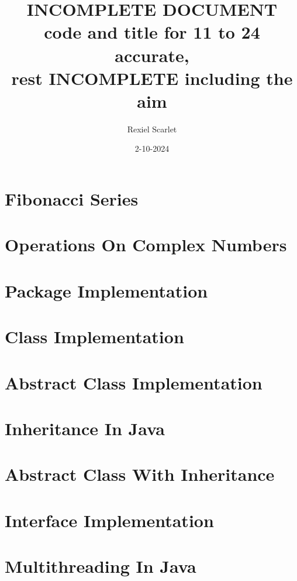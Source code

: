\documentclass{article}
\title{%
  INCOMPLETE DOCUMENT \\
  \large code and title for 11 to 24 accurate, \\
  rest INCOMPLETE including the aim \\
}
\author{Rexiel Scarlet}
\date{2-10-2024}
\begin{document}
\maketitle
\newpage

\tableofcontents
\newpage

\section{Fibonacci Series}

\newpage

\section{Operations On Complex Numbers}

\newpage

\section{Package Implementation}
\newpage

\section{Class Implementation}

\newpage

\section{Abstract Class Implementation}

\newpage

\section{Inheritance In Java}

\newpage

\section{Abstract Class With Inheritance}

\newpage

\section{Interface Implementation}

\newpage

\section{Multithreading In Java}

\newpage
\end{document}

